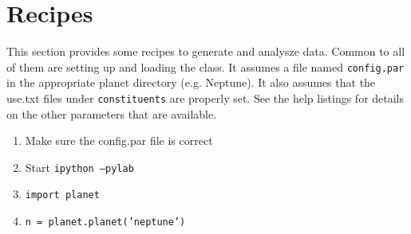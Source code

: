 \documentclass[11pt]{article}
\begin{document}
\section{Recipes}
This section provides some recipes to generate and analysze data.  Common to all of them are setting up and loading the class.  It assumes a file named \texttt{config.par} in the appropriate planet directory (e.g. Neptune).  It also assumes that the use.txt files under \texttt{constituents} are properly set.  See the help listings for details on the other parameters that are available.
\begin{enumerate}
\item Make sure the config.par file is correct
\item Start \texttt{ipython --pylab}
\item \texttt{import planet}
\item \texttt{n = planet.planet('neptune')}
\end{enumerate}
\end{document}
